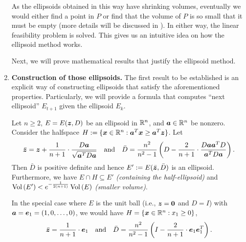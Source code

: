 \begin{enumerate}
\begin{enumerate}
\begin{center}
\end{center}
\end{enumerate}
As the ellipsoids obtained in this way have shrinking volumes, eventually we
would either find a point in \(P\) or find that the volume of \(P\) is so small
that it must be empty (more details will be discussed in
). In either way, the linear feasibility
problem is solved. This gives us an intuitive idea on how the ellipsoid method
works.

Next, we will prove mathematical results that justify the ellipsoid method.
\item \textbf{Construction of those ellipsoids.} The first result to be
established is an explicit way of constructing ellipsoids that satisfy the
aforementioned properties. Particularly, we will provide a formula that computes
``next ellipsoid'' \(E_{t+1}\) given the ellipsoid \(E_{k}\).

\begin{theorem}
\label{thm:next-ellipsoid-fmla}
Let \(n\ge 2\), \(E=E(\bm{z},D)\) be an ellipsoid in \(\mathbb{R}^n\), and
\(\bm{a}\in\mathbb{R}^n\) be nonzero. Consider the halfspace
\(H:=\{\bm{x}\in\mathbb{R}^n:\bm{a}^{T}\bm{x}\ge\bm{a}^{T}\bm{z}\}\). Let
\[
\bar{\bm{z}}=\bm{z}+\frac{1}{n+1}\cdot \frac{D\bm{a}}{\sqrt{\bm{a}^{T}D\bm{a}}}
\quad\text{and}\quad
\bar{D}=\frac{n^{2}}{n^{2}-1}\left(D-\frac{2}{n+1}\cdot 
\frac{D\bm{a}\bm{a}^{T}D}{\bm{a}^{T}D\bm{a}}\right).
\]
Then \(\bar{D}\) is positive definite and hence
\(E':=E(\bar{\bm{z}},\bar{D})\) is an ellipsoid. Furthermore, we have \(E\cap
H\subseteq E'\) \emph{(containing the half-ellipsoid)} and
\(\operatorname{Vol}\left(E'\right)<e^{-\frac{1}{2(n+1)}}\operatorname{Vol}\left(E\right)\) \emph{(smaller volume)}.
\end{theorem}
\begin{note}
In the special case where \(E\) is the unit ball (i.e.,
\(\bm{z}=\bm{0}\) and \(D=I\)) with
\(\bm{a}=\bm{e}_1=(1,0,\dotsc,0)\), we would have
\(H=\{\bm{x}\in\mathbb{R}^n:x_1\ge 0\}\),
\[
\bar{\bm{z}}=\frac{1}{n+1}\cdot \bm{e}_1
\quad\text{and}\quad
\bar{D}=\frac{n^{2}}{n^{2}-1}\left(I-\frac{2}{n+1}\cdot \bm{e}_1\bm{e}_1^{T}\right).
\]
\end{note}


\end{enumerate}
